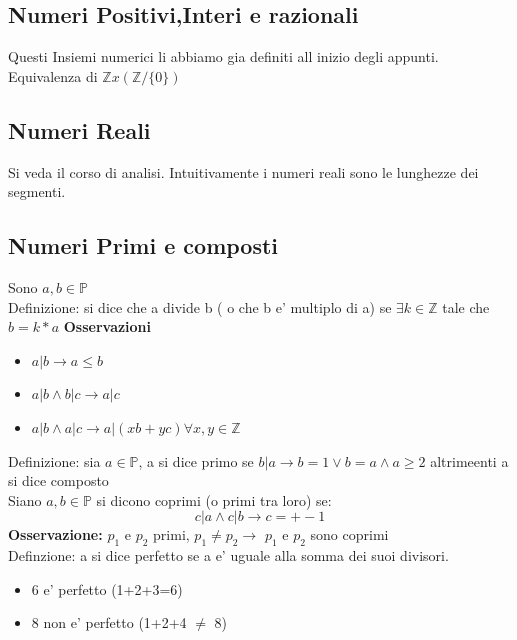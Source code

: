 \documentclass{article}
\begin{document}
    \subsection{Numeri Positivi,Interi e razionali}
    \begin{flushleft}
       Questi Insiemi numerici li abbiamo gia definiti all inizio degli appunti.
        Equivalenza di $\mathbb{Z} x (\mathbb{Z} / \{0\})$
    \end{flushleft}
    \subsection{Numeri Reali}
    \begin{flushleft}
    Si veda il corso di analisi. Intuitivamente i numeri reali sono le lunghezze dei segmenti.
    \end{flushleft}
    \subsection{Numeri Primi e composti}
    \begin{flushleft}
        Sono $a,b\in \mathbb{P}$\\
        Definizione: si dice che a divide b ( o che b e' multiplo di a) se $\exists k \in \mathbb{Z}$ tale che $b=k*a$
        \textbf{Osservazioni}
        \begin{itemize}
            \item $a|b \rightarrow a\leq b$
            \item $a|b \land b|c \rightarrow a|c$
            \item $a|b \land a|c \rightarrow a|(xb+yc) \forall x,y\in \mathbb{Z}$
        \end{itemize}
        Definizione: sia $a\in \mathbb{P}$, a si dice primo se $b|a \rightarrow b=1 \lor b=a \land a\geq 2$ altrimeenti a si dice composto \\
        Siano $a,b\in \mathbb{P}$ si dicono coprimi (o primi tra loro) se:
        \begin{equation}
            c|a \land c|b \rightarrow c=+-1
        \end{equation}
        \textbf{Osservazione:} $p_1$ e $p_2$ primi, $p_1 \neq p_2 \rightarrow$ $p_1$ e $p_2$ sono coprimi\\
       Definzione: a si dice perfetto se a e' uguale alla somma dei suoi divisori.
       \begin{itemize}
           \item 6 e' perfetto (1+2+3=6)
           \item 8 non e' perfetto (1+2+4 $\neq$ 8)
       \end{itemize}
    \end{flushleft}
\end{document}
